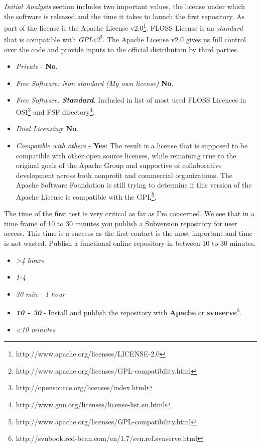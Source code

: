 \documentclass[11pt]{scrartcl}
\begin{document}
\par \emph{Initial Analysis} section includes two important values​​, the license under which the software is released and the time it takes to launch the first repository. As part of the license is the Apache License v2.0\footnote{http://www.apache.org/licenses/LICENSE-2.0}. FLOSS License is an \emph{standard} that is compatible with \emph{GPLv3}\footnote{http://www.apache.org/licenses/GPL-compatibility.html}. The Apache License v2.0 gives us full control over the code and provide inputs to the official distribution by third parties.

\begin{itemize} 
    \item \emph{Private} - \textbf{No}.
    \item \emph{Free Software: Non standard (My own license)} \textbf{No}.
    \item \emph{Free Software: \textbf{Standard}}. Included in list of most used FLOSS Licences in OSI\footnote{http://opensource.org/licenses/index.html} and FSF directory\footnote{http://www.gnu.org/licenses/license-list.en.html}.
    \item \emph{Dual Licensing}: \textbf{No}.
    \item \emph{Compatible with others} - \textbf{Yes}: The result is a license that is supposed to be compatible with other open source licenses, while remaining true to the original goals of the Apache Group and supportive of collaborative development across both nonprofit and commercial organizations. The Apache Software Foundation is still trying to determine if this version of the Apache License is compatible with the GPL\footnote{http://www.apache.org/licenses/GPL-compatibility.html}.
\end{itemize}

\par The time of the first test is very critical as far as I'm concerned. We see that in a time frame of 10 to 30 minutes you publish a Subversion repository for user access. This time is a success as the first contact is the most important and time is not wasted. Publish a functional online repository in between 10 to 30 minutes.

\begin{itemize}
    \item \emph{\textgreater 4 hours}
    \item \emph{1-4} 
    \item \emph{30 min - 1 hour}
    \item \emph{\textbf{10 - 30}} - Install and publish the repository with \textbf{Apache} or \textbf{svnserve}\footnote{http://svnbook.red-bean.com/en/1.7/svn.ref.svnserve.html}.
    \item \emph{\textless 10 minutes}
\end{itemize}
\end{document}
